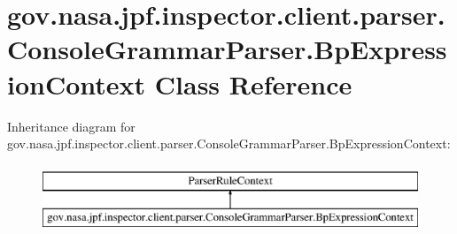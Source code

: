 \hypertarget{classgov_1_1nasa_1_1jpf_1_1inspector_1_1client_1_1parser_1_1_console_grammar_parser_1_1_bp_expression_context}{}\section{gov.\+nasa.\+jpf.\+inspector.\+client.\+parser.\+Console\+Grammar\+Parser.\+Bp\+Expression\+Context Class Reference}
\label{classgov_1_1nasa_1_1jpf_1_1inspector_1_1client_1_1parser_1_1_console_grammar_parser_1_1_bp_expression_context}
Inheritance diagram for gov.\+nasa.\+jpf.\+inspector.\+client.\+parser.\+Console\+Grammar\+Parser.\+Bp\+Expression\+Context\+:\begin{figure}[H]
\begin{center}
\leavevmode
\includegraphics[height=2.000000cm]{classgov_1_1nasa_1_1jpf_1_1inspector_1_1client_1_1parser_1_1_console_grammar_parser_1_1_bp_expression_context}
\end{center}
\end{figure}
